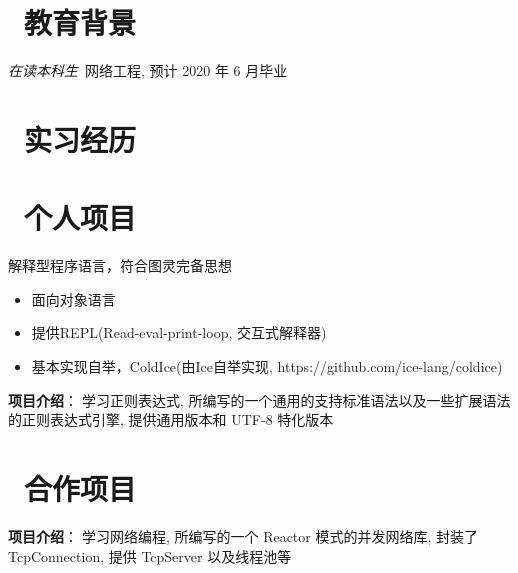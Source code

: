\documentclass{resume}
\begin{document}



\section{\faGraduationCap\  教育背景}
\textit{在读本科生}\ 网络工程, 预计 2020 年 6 月毕业

\section{\faUsers\ 实习经历}
\role{实习}{深度学习实习生}

\section{\faGithubAlt\ 个人项目}
解释型程序语言，符合图灵完备思想
\begin{onehalfspacing}
\begin{itemize}
  \item 面向对象语言
  \item 提供REPL(Read-eval-print-loop, 交互式解释器)
  \item 基本实现自举，ColdIce(由Ice自举实现, https://github.com/ice-lang/coldice)
\end{itemize}
\end{onehalfspacing}

\begin{onehalfspacing}
\textbf{项目介绍}：\c 为学习正则表达式, 所编写的一个通用的支持标准语法以及一些扩展语法的正则表达式引擎, 提供通用版本和 UTF-8 特化版本
\end{onehalfspacing}

\section{\faObjectGroup\ 合作项目}
\begin{onehalfspacing}
\textbf{项目介绍}：\c 为学习网络编程, 所编写的一个 Reactor 模式的并发网络库, 封装了 TcpConnection, 提供 TcpServer 以及线程池等
\end{onehalfspacing}
\end{document}
